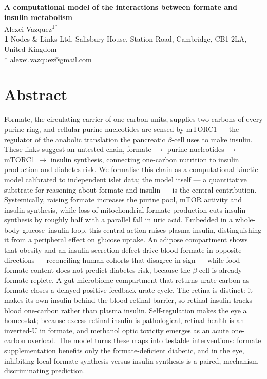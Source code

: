 \documentclass[10pt,letterpaper]{article}
\begin{document}
\vspace*{0.2in}

\begin{flushleft}
{\Large
\textbf{A computational model of the interactions between formate and insulin metabolism}
}
\newline
\\
Alexei Vazquez\textsuperscript{1*}
\\
\bigskip
\textbf{1} Nodes \& Links Ltd, Salisbury House, Station Road, Cambridge, CB1 2LA, United Kingdom
\\
\bigskip
* alexei.vazquez@gmail.com
\end{flushleft}

\section*{Abstract}
Formate, the circulating carrier of one-carbon units, supplies two carbons of
every purine ring, and cellular purine nucleotides are sensed by mTORC1 --- the
regulator of the anabolic translation the pancreatic $\beta$-cell uses to make
insulin. These links suggest an untested chain, formate $\rightarrow$ purine
nucleotides $\rightarrow$ mTORC1 $\rightarrow$ insulin synthesis, connecting
one-carbon nutrition to insulin production and diabetes risk. We formalise this
chain as a computational kinetic model calibrated to independent islet data; the
model itself --- a quantitative substrate for reasoning about formate and insulin
--- is the central contribution. Systemically, raising formate increases the
purine pool, mTOR activity and insulin synthesis, while loss of mitochondrial
formate production cuts insulin synthesis by roughly half with a parallel fall in
uric acid. Embedded in a whole-body glucose--insulin loop, this central action
raises plasma insulin, distinguishing it from a peripheral effect on glucose
uptake. An adipose compartment shows that obesity and an insulin-secretion defect
drive blood formate in opposite directions --- reconciling human cohorts that
disagree in sign --- while food formate content does not predict diabetes risk,
because the $\beta$-cell is already formate-replete. A gut-microbiome compartment
that returns urate carbon as formate closes a delayed positive-feedback urate
cycle. The retina is distinct: it makes its own insulin behind the blood-retinal
barrier, so retinal insulin tracks blood one-carbon rather than plasma insulin.
Self-regulation makes the eye a homeostat; because excess retinal insulin is
pathological, retinal health is an inverted-U in formate, and methanol optic
toxicity emerges as an acute one-carbon overload. The model turns these maps into
testable interventions: formate supplementation benefits only the
formate-deficient diabetic, and in the eye, inhibiting local formate synthesis
versus insulin synthesis is a paired, mechanism-discriminating prediction.
\end{document}
